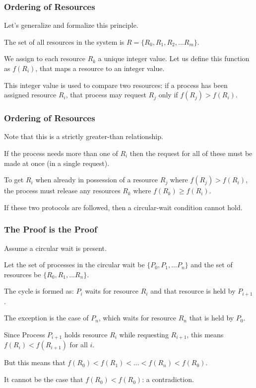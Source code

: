 \begin{frame}
	\frametitle{Ordering of Resources}

	Let's generalize and formalize this principle.

	The set of all resources in the system is $R = \{R_{0}, R_{1}, R_{2}, ... R_{m}\}$.

	We assign to each resource $R_{k}$ a unique integer value. Let us define this function as $f(R_{i})$, that maps a resource to an integer value.

	This integer value is used to compare two resources: if a process has been assigned resource $R_{i}$, that process may request $R_{j}$ only if $f(R_{j}) > f(R_{i})$.


\end{frame}

\begin{frame}
	\frametitle{Ordering of Resources}

	Note that this is a strictly greater-than relationship.

	If the process needs more than one of $R_{i}$ then the request for all of these must be made at once (in a single request).

	To get $R_{i}$ when already in possession of a resource $R_{j}$ where $f(R_{j}) > f(R_{i})$, the process must release any resources $R_{k}$ where $f(R_{k}) \geq f(R_{i})$.

	If these two protocols are followed, then a circular-wait condition cannot hold.

\end{frame}

\begin{frame}
	\frametitle{The Proof is the Proof}

	Assume a circular wait is present.

	Let the set of processes in the circular wait be $\{P_{0}, P_{1}, ... P_{n}\}$ and the set of resources be $\{R_{0}, R_{1}, ... R_{n}\}$.

	The cycle is formed as: $P_{i}$ waits for resource $R_{i}$ and that resource is held by $P_{i+1}$.

	The exception is the case of $P_{n}$, which waits for resource $R_{n}$ that is held by $P_{0}$.

	Since Process $P_{i+1}$ holds resource $R_{i}$ while requesting $R_{i+1}$, this means $f(R_{i}) < f(R_{i+1})$ for all $i$.

	But this means that $f(R_{0}) < f(R_{1}) < ... < f(R_{n}) < f(R_{0})$.

	It cannot be the case that $f(R_{0}) < f(R_{0})$: a contradiction.

\end{frame}

